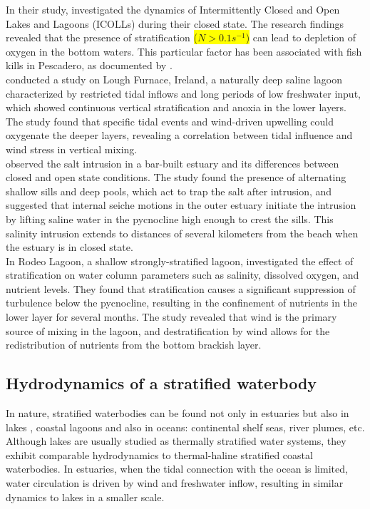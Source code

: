 \documentclass[tesis.tex]{subfiles}
\begin{document}
In their study, \cite{Gale2006} investigated the dynamics of Intermittently Closed and Open Lakes and Lagoons (ICOLLs) during their closed state. The research findings revealed that the presence of stratification \colorbox{yellow}{($N > 0.1 s^{-1}$)} can lead to  depletion of oxygen in the bottom waters. This particular factor has been associated with fish kills in Pescadero, as documented by \citep{largier2015}.\\

\cite{Kelly2018} conducted a study on Lough Furnace, Ireland, a naturally deep saline lagoon characterized by restricted tidal inflows and long periods of low freshwater input, which showed continuous vertical stratification and anoxia in the lower layers. The study found that specific tidal events and wind-driven upwelling could oxygenate the deeper layers, revealing a correlation between tidal influence and wind stress in vertical mixing.\\

\cite{Behrens2016} observed the salt intrusion in a bar-built estuary and its differences between closed and open state conditions. The study found the presence of alternating shallow sills and deep pools, which act to trap the salt after intrusion, and suggested that internal seiche motions in the outer estuary initiate the intrusion by lifting saline water in the pycnocline high enough to crest the sills. This salinity intrusion extends to distances of several kilometers from the beach when the estuary is in closed state.\\

In Rodeo Lagoon, a shallow strongly-stratified lagoon, \citep{Cousins2010} investigated the effect of stratification on water column parameters such as salinity, dissolved oxygen, and nutrient levels. They found that stratification causes a significant suppression of turbulence below the pycnocline, resulting in the confinement of nutrients in the lower layer for several months. The study revealed that wind is the primary source of mixing in the lagoon, and destratification by wind allows for the redistribution of nutrients from the bottom brackish layer.\\

\subsection{Hydrodynamics of a stratified waterbody}

In nature, stratified waterbodies can be found not only in estuaries \citep{human2016} but also in lakes \citep{Valerio2012, Imam2013, Coman2012}, coastal lagoons \citep{Cousins2010} and also in oceans: continental shelf seas, river plumes, etc. Although lakes are usually studied as thermally stratified water systems, they exhibit comparable hydrodynamics to thermal-haline stratified coastal waterbodies. In estuaries, when the tidal connection with the ocean is limited, water circulation is driven by wind and freshwater inflow, resulting in similar dynamics to lakes in a smaller scale. \\
\end{document}
